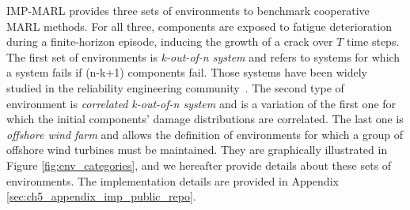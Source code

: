 IMP-MARL provides three sets of environments to benchmark cooperative MARL methods.
For all three, components are exposed to fatigue deterioration during a finite-horizon episode, inducing the growth of a crack over $T$ time steps.
The first set of environments is \textit{k-out-of-n system} and refers to systems for which a system fails if (n-k+1) components fail.
Those systems have been widely studied in the reliability engineering community~\citep{barlow1984computing}. 
The second type of environment is \textit{correlated k-out-of-n system} and is a variation of the first one for which the initial components' damage distributions are correlated.
The last one is \textit{offshore wind farm} and allows the definition of environments for which a group of offshore wind turbines must be maintained.
They are graphically illustrated in Figure \ref{fig:env_categories}, and we hereafter provide details about these sets of environments.
The implementation details are provided in Appendix \ref{sec:ch5_appendix_imp_public_repo}.

